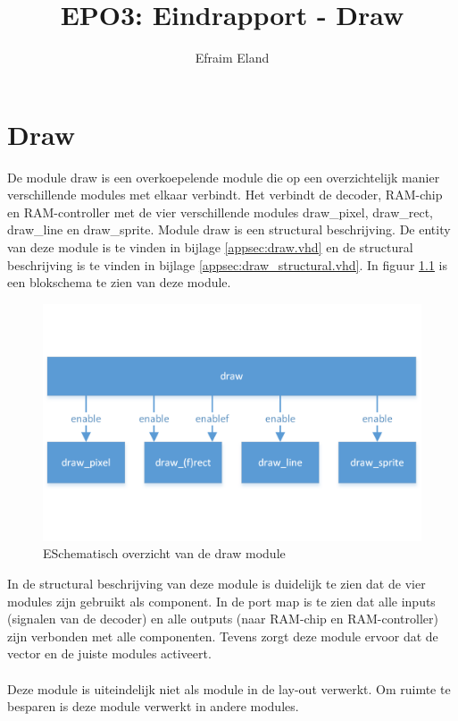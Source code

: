 \documentclass{scrartcl} %
\author{Efraim Eland}
\title{EPO3: Eindrapport - Draw}
\begin{document}
\chapter{Draw}
\label{ch:draw}

De module draw is een overkoepelende module die op een overzichtelijk manier verschillende modules met elkaar verbindt. Het verbindt de decoder, RAM-chip en RAM-controller met de vier verschillende modules draw\_pixel, draw\_rect, draw\_line en draw\_sprite. Module draw is een structural beschrijving. De entity van deze module is te vinden in bijlage \ref{appsec:draw.vhd} en de structural beschrijving is te vinden in bijlage \ref{appsec:draw_structural.vhd}. In figuur \ref{fig:draw} is een blokschema te zien van deze module.

\begin{figure}[H]
	\centering
	\includegraphics[width=\textwidth]{resource/draw.png}
	\caption{ESchematisch overzicht van de draw module}
	\label{fig:draw}
\end{figure}

In de structural beschrijving van deze module is duidelijk te zien dat de vier modules zijn gebruikt als component. In de port map is te zien dat alle inputs (signalen van de decoder) en alle outputs (naar RAM-chip en RAM-controller) zijn verbonden met alle componenten. Tevens zorgt deze module ervoor dat de vector en de juiste modules activeert.
\\\\
Deze module is uiteindelijk niet als module in de lay-out verwerkt. Om ruimte te besparen is deze module verwerkt in andere modules.
\end{document}

